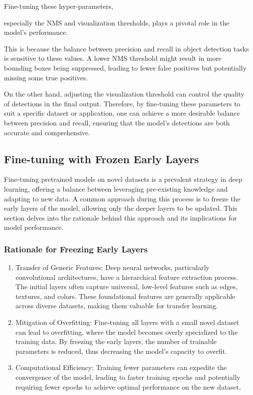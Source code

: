 \documentclass{article}
\begin{document}
Fine-tuning these hyper-parameters, 

especially the NMS and visualization thresholds, plays a pivotal role in the model's performance. 

This is because the balance between precision and recall in object detection tasks is sensitive to these values. A lower NMS threshold might result in more bounding boxes being suppressed, leading to fewer false positives but potentially missing some true positives. 

On the other hand, adjusting the visualization threshold can control the quality of detections in the final output. Therefore, by fine-tuning these parameters to suit a specific dataset or application, one can achieve a more desirable balance between precision and recall, ensuring that the model's detections are both accurate and comprehensive.

\subsection{Fine-tuning with Frozen Early Layers}

Fine-tuning pretrained models on novel datasets is a prevalent strategy in deep learning, offering a balance between leveraging pre-existing knowledge and adapting to new data. A common approach during this process is to freeze the early layers of the model, allowing only the deeper layers to be updated. This section delves into the rationale behind this approach and its implications for model performance.

\subsubsection{Rationale for Freezing Early Layers}

\begin{enumerate}
\item Transfer of Generic Features: Deep neural networks, particularly convolutional architectures, have a hierarchical feature extraction process. The initial layers often capture universal, low-level features such as edges, textures, and colors. These foundational features are generally applicable across diverse datasets, making them valuable for transfer learning.

\item Mitigation of Overfitting: Fine-tuning all layers with a small novel dataset can lead to overfitting, where the model becomes overly specialized to the training data. By freezing the early layers, the number of trainable parameters is reduced, thus decreasing the model's capacity to overfit.

\item Computational Efficiency: Training fewer parameters can expedite the convergence of the model, leading to faster training epochs and potentially requiring fewer epochs to achieve optimal performance on the new dataset.
\end{enumerate}
\end{document}
